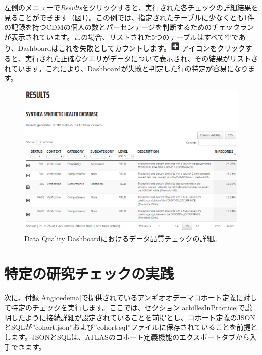 \documentclass[
  11pt]{book}
\theoremstyle{definition}
\theoremstyle{definition}
\theoremstyle{definition}
\theoremstyle{definition}
\theoremstyle{remark}
\begin{document}
左側のメニューで\emph{Results}をクリックすると、実行された各チェックの詳細結果を見ることができます（図\ref{fig:dqdResults}）。この例では、指定されたテーブルに少なくとも1件の記録を持つCDMの個人の数とパーセンテージを判断するためのチェックランが表示されています。この場合、リストされた5つのテーブルはすべて空であり、Dashboardはこれを失敗としてカウントします。\includegraphics{images/DataQuality/plusIcon.png} アイコンをクリックすると、実行された正確なクエリがデータについて表示され、その結果がリストされています。これにより、Dashboardが失敗と判定した行の特定が容易になります。

\begin{figure}

{\centering \includegraphics[width=1\linewidth]{images/DataQuality/dqdResults} 

}

\caption{Data Quality Dashboardにおけるデータ品質チェックの詳細。}\label{fig:dqdResults}
\end{figure}

\section{特定の研究チェックの実践}\label{ux7279ux5b9aux306eux7814ux7a76ux30c1ux30a7ux30c3ux30afux306eux5b9fux8df5}

次に、付録\ref{Angioedema}で提供されているアンギオオデーマコホート定義に対して特定のチェックを実行します。ここでは、セクション\ref{achillesInPractice}で説明したように接続詳細が設定されていることを前提とし、コホート定義のJSONとSQLが''cohort.json''および''cohort.sql''ファイルに保存されていることを前提とします。JSONとSQLは、ATLASのコホート定義機能のエクスポートタブから入手できます。
\end{document}
